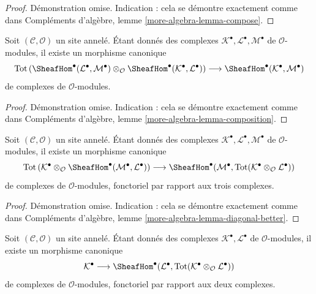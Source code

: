 \begin{proof}
Démonstration omise. Indication : cela se démontre exactement comme dans
Compléments d'algèbre, lemme \ref{more-algebra-lemma-compose}.
\end{proof}

\begin{lemma}
\label{lemma-composition}
Soit $(\mathcal{C}, \mathcal{O})$ un site annelé. Étant donnés des complexes
$\mathcal{K}^\bullet, \mathcal{L}^\bullet, \mathcal{M}^\bullet$
de $\mathcal{O}$-modules, il existe un morphisme canonique
$$
\text{Tot}\left(
\SheafHom^\bullet(\mathcal{L}^\bullet, \mathcal{M}^\bullet)
\otimes_\mathcal{O}
\SheafHom^\bullet(\mathcal{K}^\bullet, \mathcal{L}^\bullet)
\right)
\longrightarrow
\SheafHom^\bullet(\mathcal{K}^\bullet, \mathcal{M}^\bullet)
$$
de complexes de $\mathcal{O}$-modules.
\end{lemma}

\begin{proof}
Démonstration omise. Indication : cela se démontre exactement comme dans
Compléments d'algèbre, lemme \ref{more-algebra-lemma-composition}.
\end{proof}

\begin{lemma}
\label{lemma-diagonal-better}
Soit $(\mathcal{C}, \mathcal{O})$ un site annelé. Étant donnés des complexes
$\mathcal{K}^\bullet, \mathcal{L}^\bullet, \mathcal{M}^\bullet$
de $\mathcal{O}$-modules, il existe un morphisme canonique
$$
\text{Tot}\left(
\mathcal{K}^\bullet \otimes_\mathcal{O}
\SheafHom^\bullet(\mathcal{M}^\bullet, \mathcal{L}^\bullet)
\right)
\longrightarrow
\SheafHom^\bullet(\mathcal{M}^\bullet,
\text{Tot}(\mathcal{K}^\bullet \otimes_\mathcal{O} \mathcal{L}^\bullet))
$$
de complexes de $\mathcal{O}$-modules, fonctoriel par rapport aux trois complexes.
\end{lemma}

\begin{proof}
Démonstration omise. Indication : cela se démontre exactement comme dans
Compléments d'algèbre, lemme \ref{more-algebra-lemma-diagonal-better}.
\end{proof}

\begin{lemma}
\label{lemma-diagonal}
Soit $(\mathcal{C}, \mathcal{O})$ un site annelé. Étant donnés des complexes
$\mathcal{K}^\bullet, \mathcal{L}^\bullet$
de $\mathcal{O}$-modules, il existe un morphisme canonique
$$
\mathcal{K}^\bullet
\longrightarrow
\SheafHom^\bullet(\mathcal{L}^\bullet,
\text{Tot}(\mathcal{K}^\bullet \otimes_\mathcal{O} \mathcal{L}^\bullet))
$$
de complexes de $\mathcal{O}$-modules, fonctoriel par rapport aux deux complexes.
\end{lemma}

